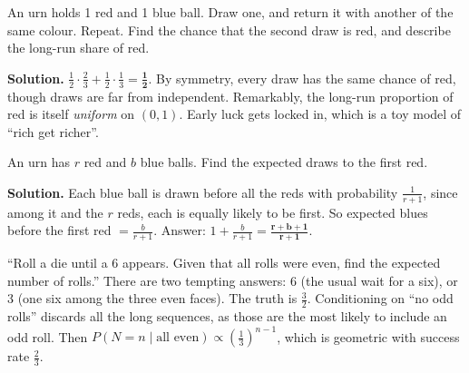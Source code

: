 \documentclass[11pt,a4paper,openany]{report}
\begin{document}
\begin{example}
An urn holds 1 red and 1 blue ball. Draw one, and return it with another of the same colour. Repeat. Find the chance that the second draw is red, and describe the long-run share of red.

\textbf{Solution.} $\frac12\cdot\frac23+\frac12\cdot\frac13=\mathbf{\frac12}$. By symmetry, every draw has the same chance of red, though draws are far from independent. Remarkably, the long-run proportion of red is itself \emph{uniform} on $(0,1)$. Early luck gets locked in, which is a toy model of ``rich get richer''.
\end{example}

\begin{example}
An urn has $r$ red and $b$ blue balls. Find the expected draws to the first red.

\textbf{Solution.} Each blue ball is drawn before all the reds with probability $\frac1{r+1}$, since among it and the $r$ reds, each is equally likely to be first. So expected blues before the first red $=\frac b{r+1}$. Answer: $1+\frac b{r+1}=\mathbf{\frac{r+b+1}{r+1}}$.
\end{example}

\begin{trap}
``Roll a die until a 6 appears. Given that all rolls were even, find the expected number of rolls.'' There are two tempting answers: 6 (the usual wait for a six), or 3 (one six among the three even faces). The truth is $\frac32$. Conditioning on ``no odd rolls'' discards all the long sequences, as those are the most likely to include an odd roll. Then $P(N=n\mid\text{all even})\propto\left(\frac13\right)^{n-1}$, which is geometric with success rate $\frac23$.
\end{trap}
\end{document}
